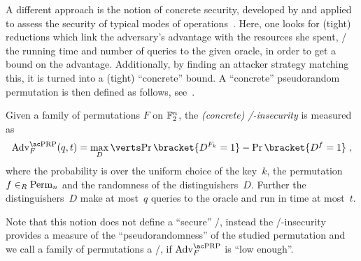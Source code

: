 A different approach is the notion of concrete security, developed by \textcite{C:BelKilRog94} and applied to assess the security of typical modes of operations~\cite{FOCS:BDJR97}.
Here, one looks for (tight) reductions which link the adversary's advantage with the resources she spent, \ie/ the running time and number of queries to the given oracle, in order to get a bound on the advantage.
Additionally, by finding an attacker strategy matching this, it is turned into a (tight) \enquote{concrete} bound.
A \enquote{concrete} pseudorandom permutation is then defined as follows, see~\cite[Definition~2.2]{C:BelKilRog94}.
\begin{definition}\label{def:concrete-prp}
    Given a family of permutations $F$ on $\mathbb{F}_2^n$, the \emph{(concrete) \PRP/-insecurity} is measured as
    \begin{equation*}
        \mathrm{Adv}^{\text{\PRP/}}_F(q,t) = \max_D \abs{\Prob\bracket{D^{F_k} = 1} - \Prob\bracket{D^{f} = 1}}\;,
    \end{equation*}
    where the probability is over the uniform choice of the key~$k$, the permutation $f \in_R \perm/_n$ and the randomness of the distinguishers~$D$.
    Further the distinguishers~$D$ make at most~$q$ queries to the oracle and run in time at most~$t$.
\end{definition}
Note that this notion does not define a \enquote{secure} \PRP/, instead the \PRP/-insecurity provides a measure of the \enquote{pseudorandomness} of the studied permutation and we call a family of permutations a \PRP/, if $\mathrm{Adv}^{\text{\PRP/}}_F$ is \enquote{low enough}.


